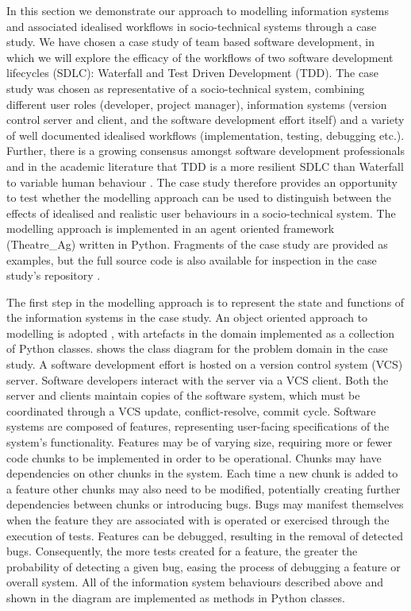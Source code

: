 \documentclass{llncs}
\begin{document}
In this section we demonstrate our approach to modelling information systems and associated idealised workflows in
socio-technical systems through a case study.  We have chosen a case study of team based software development, in which
we will explore the efficacy of the workflows of two software development lifecycles (SDLC): Waterfall and Test Driven
Development (TDD).  The case study was chosen as representative of a socio-technical system, combining different user
roles (developer, project manager), information systems (version control server and client, and the software development
effort itself) and a variety of well documented idealised workflows (implementation, testing, debugging etc.).  Further,
there is a growing consensus amongst software development professionals and in the academic literature that TDD is a more resilient SDLC
than Waterfall to variable human behaviour
\citep{Bhat2006TestDrivenDevelopment,George2004TestDrivenDevelopment,Huang2009EmpiricalTestFirstProgramming}.  The case
study therefore provides an opportunity to test whether the modelling approach can be used to distinguish between the
effects of idealised and realistic user behaviours in a socio-technical system.  The modelling approach is implemented
in an agent oriented framework (Theatre\_Ag) written in Python.  Fragments of the case study are provided as examples,
but the full source code is also available for inspection in the case study's repository 
\cite{storer2016softdev-workflow-scm}.

The first step in the modelling approach is to represent the state and functions of the information systems in the case
study. An object oriented approach to modelling is adopted \cite{omg07omguml}, with artefacts in the domain
implemented as a collection of Python classes.   shows the class diagram for the problem domain in
the case study.  A software development effort is hosted on a version control system (VCS) server.  Software developers
interact with the server via a VCS client.  Both the server and clients maintain copies of the software system, which must
be coordinated through a VCS update, conflict-resolve, commit cycle.  Software systems are composed of features,
representing user-facing specifications of the system's functionality.  Features may be of varying size, requiring more
or fewer code chunks to be implemented in order to be operational.  Chunks may have dependencies on other chunks in the
system.  Each time a new chunk is added to a feature other chunks may also need to be modified, potentially creating
further dependencies between chunks or introducing bugs.  Bugs may manifest themselves when the feature they are
associated with is operated or exercised through the execution of tests.  Features can be debugged, resulting in the
removal of detected bugs.  Consequently, the more tests created for a feature, the greater the probability of detecting
a given bug, easing the process of debugging a feature or overall system. All of the information system behaviours
described above and shown in the diagram are implemented as methods in Python classes.
\end{document}
